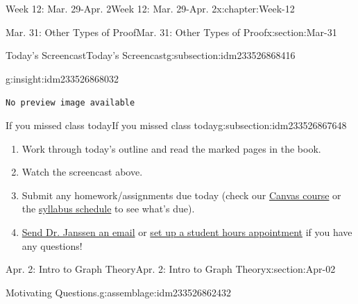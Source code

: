 \documentclass[oneside,10pt,]{book}
\newcommand{\mono}[1]{\texttt{#1}}
\numberwithin{equation}{section}
\newlength{\qrsize}
\newlength{\previewwidth}
\begin{document}
\begin{chapterptx}{Week 12: Mar. 29-Apr. 2}{}{Week 12: Mar. 29-Apr. 2}{}{}{x:chapter:Week-12}
\begin{sectionptx}{Mar. 31: Other Types of Proof}{}{Mar. 31: Other Types of Proof}{}{}{x:section:Mar-31}
\begin{subsectionptx}{Today's Screencast}{}{Today's Screencast}{}{}{g:subsection:idm233526868416}
\begin{insight}{}{g:insight:idm233526868032}%
\setlength{\qrsize}{9em}
\setlength{\previewwidth}{\linewidth}
\addtolength{\previewwidth}{-\qrsize}
\begin{tcbraster}[raster columns=2, raster column skip=1pt, raster halign=center, raster force size=false, raster left skip=0pt, raster right skip=0pt]%
\begin{tcolorbox}[previewstyle, width=\previewwidth]%
\mono{No preview image available}%
\end{tcolorbox}%
\begin{tcolorbox}[qrstyle]%
[QR LINK]\end{tcolorbox}%
\end{tcbraster}%
\end{insight}
\end{subsectionptx}
%
%
\typeout{************************************************}
\typeout{************************************************}
%
\begin{subsectionptx}{If you missed class today}{}{If you missed class today}{}{}{g:subsection:idm233526867648}
%
\begin{enumerate}
\item{}Work through today's outline and read the marked pages in the book.%
\item{}Watch the screencast above.%
\item{}Submit any homework\slash{}assignments due today (check our \href{https://dordt.instructure.com/courses/3110050}{Canvas course} or the \href{https://prof.mkjanssen.org/ds/index.html\#schedule}{syllabus schedule} to see what's due).%
\item{}\href{mailto:mike.janssen@dordt.edu}{Send Dr. Janssen an email} or \href{https://calendly.com/mkjanssen/student-hours}{set up a student hours appointment} if you have any questions!%
\end{enumerate}
\end{subsectionptx}
\end{sectionptx}
%
%
\typeout{************************************************}
\typeout{************************************************}
%
\begin{sectionptx}{Apr. 2: Intro to Graph Theory}{}{Apr. 2: Intro to Graph Theory}{}{}{x:section:Apr-02}
\begin{introduction}{}%
\begin{assemblage}{Motivating Questions.}{g:assemblage:idm233526862432}%

\end{assemblage}
\end{introduction}
\end{sectionptx}
\end{chapterptx}
\end{document}
